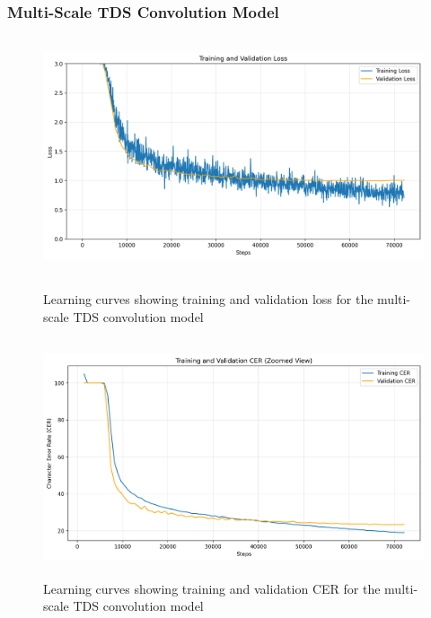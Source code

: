 \subsubsection{Multi-Scale TDS Convolution Model}
\begin{figure}[H]
    \centering
    \begin{minipage}{0.48\textwidth}
        \centering
        \includegraphics[height=7cm,width=\textwidth]{../results/model-multi-scale-tiny/loss_plot.png}
        \caption{Learning curves showing training and validation loss for the multi-scale TDS convolution model}
        \label{fig:multi_scale_loss}
    \end{minipage}
    \hfill
    \begin{minipage}{0.48\textwidth}
        \centering
        \includegraphics[height=7cm, width=\textwidth]{../results/model-multi-scale-tiny/cer_zoomed_plot.png}
        \caption{Learning curves showing training and validation CER for the multi-scale TDS convolution model}
        \label{fig:multi_scale_cer}
    \end{minipage}
\end{figure}

